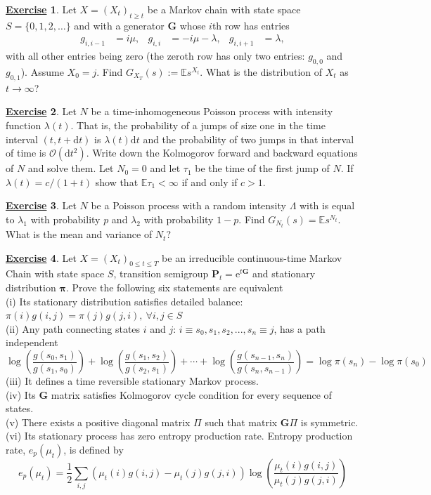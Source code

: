\documentclass[12pt]{book}
\numberwithin{equation}{chapter}
\theoremstyle{plain}
\numberwithin{theorem}{section}
\theoremstyle{definition}
\newtheorem{exercise}{\underline{Exercise}}
\numberwithin{exercise}{chapter}
\newcommand{\<}{\langle}
\renewcommand{\>}{\rangle}
\renewcommand{\(}{\left(}
\renewcommand{\)}{\right)}
\renewcommand{\[}{\left[}
\renewcommand{\]}{\right]}
\newcommand\Eb{\mathds{E}}
\newcommand\Oc{\mathscr{O}}
\newcommand\Lam{\Lambda}
\newcommand\lam{\lambda}
\newcommand\Gv{\pmb{G}}
\newcommand\Pv{\pmb{P}}
\newcommand\piv{\pmb{\pi}}
\newcommand\dd{\mathrm{d}}
\newcommand\ee{\mathrm{e}}
\begin{document}
\begin{exercise}
\label{exer:5.3}
Let $X = (X_t)_{t \geq t}$ be a Markov chain with state space $S=\{0,1,2,\ldots\}$ and with a generator $\Gv$ whose $i$th row has entries
\begin{align}
g_{i,i-1}
	&=	i \mu , &
g_{i,i}
	&=	- i \mu - \lam , &
g_{i,i+1} 
	&=	\lam ,
\end{align}
with all other entries being zero (the zeroth row has only two entries: $g_{0,0}$ and $g_{0,1}$).  Assume $X_0 = j$.  Find $G_{X_T}(s) := \Eb s^{X_t}$.  What is the distribution of $X_t$ as $t \to \infty$?
\end{exercise}
%

\begin{exercise}
\label{exer:5.4}
Let $N$ be a time-inhomogeneous Poisson process with intensity function $\lam(t)$.  That is, the probability of a jumps of size one in the time interval $(t,t+\dd t)$ is $\lam(t) \dd t$ and the probability of two jumps in that interval of time is $\Oc(\dd t^2)$.  Write down the Kolmogorov forward and backward equations of $N$ and solve them.  Let $N_0 = 0$ and let $\tau_1$ be the time of the first jump of $N$.  If $\lam(t) = c/(1+t)$ show that $\Eb \tau_1 < \infty$ if and only if $c>1$.
\end{exercise}
%

\begin{exercise}
\label{exer:5.5}
Let $N$ be a Poisson process with a random intensity $\Lam$ with is equal to $\lam_1$ with probability $p$ and $\lam_2$ with probability $1-p$.  Find $G_{N_t}(s) = \Eb s^{N_t}$.  What is the mean and variance of $N_t$?
\end{exercise}

\begin{exercise}
\label{exer:5.6}
Let $X=(X_t)_{0 \leq t \leq T}$ be an irreducible continuous-time Markov Chain with 
state space $S$, transition semigroup $\Pv_t = \ee^{t\Gv}$ and stationary distribution $\piv$. Prove the following six statements are equivalent\\
(i) Its stationary distribution satisfies detailed balance: $\pi(i)g(i,j) = \pi(j)g(j,i), \ \forall i,j \in S$\\
(ii) Any path connecting states $i$ and $j$: $i \equiv s_0, s_1, s_2, ..., s_n \equiv j$, has a path independent
$$\log\left( \frac{g(s_0, s_1)}{g(s_1, s_0)} \right) + \log\left( \frac{g(s_1, s_2)}{g(s_2, s_1)} \right) + \cdots + \log\left( \frac{g(s_{n-1}, s_n)}{g(s_n, s_{n-1})} \right) = \log \pi(s_n) - \log \pi(s_0) $$
(iii) It defines a time reversible stationary Markov process.\\
(iv) Its $\Gv$ matrix satisfies Kolmogorov cycle condition for every sequence of states.\\
(v) There exists a positive diagonal matrix $\Pi$ such that matrix $\Gv \Pi $ is symmetric.\\
(vi) Its stationary process has zero entropy production rate. 
Entropy production rate, $e_p (\mu_t)$, is defined by
$$e_p(\mu_t) = \frac{1}{2} \sum_{i, j} \left(\mu_t{(i)} g(i,j)-\mu_t{(j)}g(j,i) \right) 
\log\left(\frac{\mu_t(i) g(i,j)}{\mu_t{(j)}g(j,i)}\right)    $$
\end{exercise}
\end{document}
